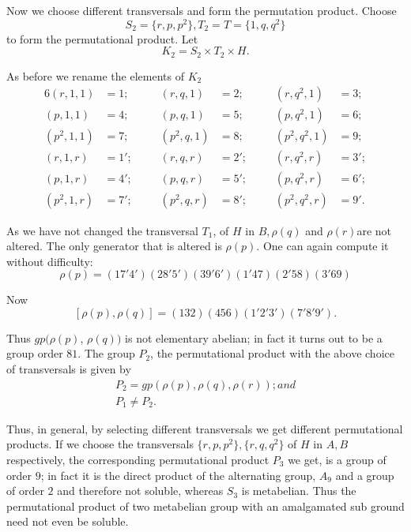 Now we choose different transversals and form the permutation
pro\-duct. Choose 
$$
S_2 = \bigg\{ r, p, p^2 \bigg\}, T_2 = T = \bigg\{1, q, q^2 \bigg\}
$$
to form the permutational product. Let 
$$
K_2 = S_2 \times T_2 \times H.
$$

As before we rename the elements of $K_2$
\begin{alignat*}{6}
  (r, 1,1) & = 1;\quad & (r,q, 1) &= 2; &(r, q^2,  1) &= 3; \\
  (p, 1,1) & = 4 ; &(p,q, 1)& = 5;& (p, q^2,  1)& = 6; \\
  (p^2, 1,1) & = 7 ;\qquad  &(p^2,q, 1) &= 8;\qquad  & (p^2, q^2, 1)& = 9; \\
  (r, 1,r) & = 1'; &(r, q, r)& = 2'; &(r, q^2,  r)& = 3'; \\
  (p, 1,r) & = 4'; &(p, q, r)& = 5'; &(p, q^2,  r)& = 6'; \\
  (p^2, 1,r) & = 7'; &(p^2, q, r) &= 8'; &(p^2, q^2,  r)& = 9'. 
\end{alignat*}

As we have not changed the transversal $T_1$, of $H$ in $B, \rho(q)$
and $\rho(r)$\pageoriginale are not altered. The only generator that is altered is
$\rho(p)$. One can again compute it without difficulty: 
$$
\rho(p) = (17'4') (28' 5') (39' 6') (1' 47) (2' 58) (3' 69)
$$

Now
$$
[\rho(p), \rho(q)] = (132) (456) (1'2'3') (7'8'9').
$$

Thus $gp (\rho(p)$, $\rho(q))$ is not elementary abelian; in fact it
turns out to be a group order $81$. The group $P_2$, the permutational
product with the above choice of transversals is given by  
\begin{gather*}
  P_2 = gp (\rho(p), \rho(q),  \rho(r)); and \\
  P_1 \neq P_2.
\end{gather*}

Thus, in general, by selecting different transversals we get different
permutational products. If we choose the transversals $\{r, p, p^2
\},  \{r,  q, q^2 \}$ of $H$ in $A,B$ respectively, the
corresponding permutational product $P_3$ we get, is a group of order
$9$; in fact it is the direct product of the alternating group, $A_9$
and a group of order $2$ and therefore not soluble, whereas $S_3$ is
metabelian. Thus the permutational product of two metabelian group
with an amalgamated sub ground need not even be soluble. 

\section{}\label{chap10:sec4}%

